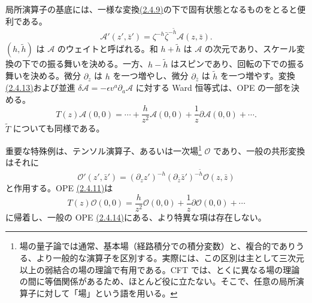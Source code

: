 局所演算子の基底には、一様な変換\hyperref[eq:2.4.9]{(2.4.9)}の下で固有状態となるものをとると便利である。
\begin{equation}
\mathcal A'(z',\bar z')=\zeta^{-h}\bar\zeta^{-\tilde h}\mathcal A(z,\bar z).
\tag{2.4.13}\label{eq:2.4.13}
\end{equation}
$(h,\tilde h)$ は $\mathcal A$ のウェイトと呼ばれる。和 $h+\tilde h$ は $\mathcal A$ の次元であり、スケール変換の下での振る舞いを決める。一方、$h-\tilde h$ はスピンであり、回転の下での振る舞いを決める。微分 $\partial_z$ は $h$ を一つ増やし、微分 $\partial_{\bar z}$ は $\tilde h$ を一つ増やす。変換\hyperref[eq:2.4.13]{(2.4.13)}および並進
$\delta\mathcal A=-\epsilon v^a\partial_a\mathcal A$ に対する Ward 恒等式は、OPE の一部を決める。
\begin{equation}
T(z)\mathcal A(0,0)
=\cdots+\frac h{z^2}\mathcal A(0,0)
+\frac1z\partial\mathcal A(0,0)+\cdots.
\tag{2.4.14}\label{eq:2.4.14}
\end{equation}
$\widetilde T$ についても同様である。

重要な特殊例は、テンソル演算子、あるいは一次場\footnote[3]{場の量子論では通常、基本場（経路積分での積分変数）と、複合的でありうる、より一般的な演算子を区別する。実際には、この区別は主として三次元以上の弱結合の場の理論で有用である。CFT では、とくに異なる場の理論の間に等価関係があるため、ほとんど役に立たない。そこで、任意の局所演算子に対して「場」という語を用いる。}
$\mathcal O$ であり、一般の共形変換はそれに
\begin{equation}
\mathcal O'(z',\bar z')
=(\partial_z z')^{-h}
(\partial_{\bar z}\bar z')^{-\tilde h}\mathcal O(z,\bar z)
\tag{2.4.15}\label{eq:2.4.15}
\end{equation}
と作用する。OPE \hyperref[eq:2.4.11]{(2.4.11)}は
\begin{equation}
T(z)\mathcal O(0,0)
=\frac h{z^2}\mathcal O(0,0)+\frac1z\partial\mathcal O(0,0)+\cdots
\tag{2.4.16}\label{eq:2.4.16}
\end{equation}
に帰着し、一般の OPE \hyperref[eq:2.4.14]{(2.4.14)}にある、より特異な項は存在しない。

